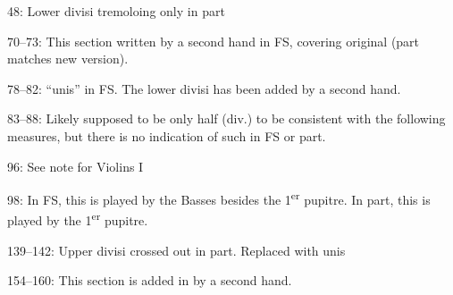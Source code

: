 \documentclass[twoside]{article}
\begin{document}
\begin{hangparas}{15pt}{1}
\begin{multicols}{2}
48: Lower divisi tremoloing only in part

70--73: This section written by a second hand in FS, covering original (part matches new version).

78--82: ``unis'' in FS. The lower divisi has been added by a second hand.

83--88: Likely supposed to be only half (div.) to be consistent with the following measures, but there is no indication of such in FS or part.

96: See note for Violins I

98: In FS, this is played by the Basses besides the 1\textsuperscript{er} pupitre. In part, this is played by the 1\textsuperscript{er} pupitre.

139--142: Upper divisi crossed out in part. Replaced with unis

154--160: This section is added in by a second hand.

\end{multicols}

\end{hangparas}
\end{document}
